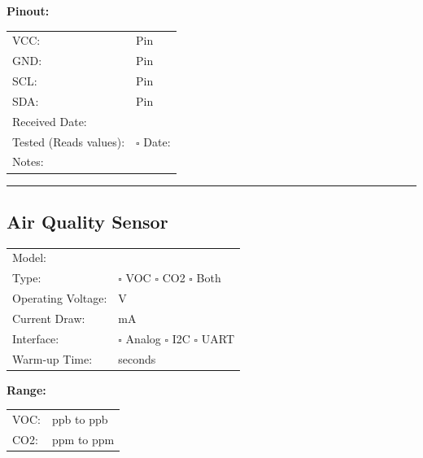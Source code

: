 \documentclass[10pt,letterpaper]{article}
\begin{document}
\textbf{Pinout:}
\begin{tabularx}{\textwidth}{lX}
VCC: & Pin \underline{\hspace{1cm}} \\
GND: & Pin \underline{\hspace{1cm}} \\
SCL: & Pin \underline{\hspace{1cm}} \\
SDA: & Pin \underline{\hspace{1cm}} \\[0.5em]
Received Date: & \underline{\hspace{4cm}} \\
Tested (Reads values): & $\square$ \quad Date: \underline{\hspace{3cm}} \\
Notes: & \underline{\hspace{10cm}} \\
\end{tabularx}

\vspace{0.5em}
\hrule
\vspace{0.5em}

\subsection*{Air Quality Sensor}
\begin{tabularx}{\textwidth}{lX}
Model: & \underline{\hspace{8cm}} \\
Type: & $\square$ VOC $\square$ CO2 $\square$ Both \\
Operating Voltage: & \underline{\hspace{4cm}} V \\
Current Draw: & \underline{\hspace{4cm}} mA \\
Interface: & $\square$ Analog $\square$ I2C $\square$ UART \\
Warm-up Time: & \underline{\hspace{4cm}} seconds \\
\end{tabularx}

\textbf{Range:}
\begin{tabularx}{\textwidth}{lX}
VOC: & \underline{\hspace{2cm}} ppb to \underline{\hspace{2cm}} ppb \\
CO2: & \underline{\hspace{2cm}} ppm to \underline{\hspace{2cm}} ppm \\
\end{tabularx}
\end{document}
